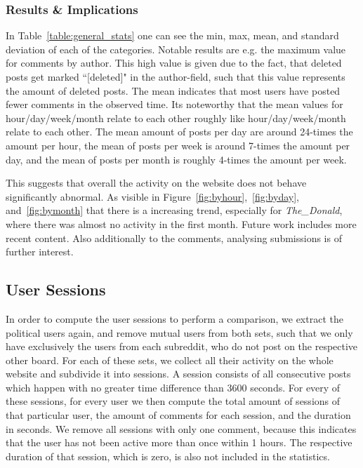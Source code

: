 \documentclass[runningheads,a4paper]{llncs}
\begin{document}
	\subsubsection{Results \& Implications}
	In Table~\ref{table:general_stats} one can see the min, max, mean, and standard deviation of each of the categories. Notable results are e.g. the maximum value for comments by author. This high value is given due to the fact, that deleted posts get marked ``[deleted]" in the author-field, such that this value represents the amount of deleted posts. The mean indicates that most users have posted fewer comments in the observed time. Its noteworthy that the mean values for hour/day/week/month relate to each other roughly like hour/day/week/month relate to each other. The mean amount of posts per day are around 24-times the amount per hour, the mean of posts per week is around 7-times the amount per day, and the mean of posts per month is roughly 4-times the amount per week.
	
	This suggests that overall the activity on the website does not behave significantly abnormal. As visible in Figure~\ref{fig:byhour},~\ref{fig:byday}, and~\ref{fig:bymonth} that there is a increasing trend, especially for \textit{The\_Donald}, where there was almost no activity in the first month. Future work includes more recent content. Also additionally to the comments, analysing submissions is of further interest.
	\subsection{User Sessions}
	In order to compute the user sessions to perform a comparison, we extract the political users again, and remove mutual users from both sets, such that we only have exclusively the users from each subreddit, who do not post on the respective other board. For each of these sets, we collect all their activity on the whole website and subdivide it into sessions. A session consists of all consecutive posts which happen with no greater time difference than 3600 seconds. For every of these sessions, for every user we then compute the total amount of sessions of that particular user, the amount of comments for each session, and the duration in seconds. We remove all sessions with only one comment, because this indicates that the user has not been active more than once within 1 hours. The respective duration of that session, which is zero, is also not included in the statistics.
\end{document}
